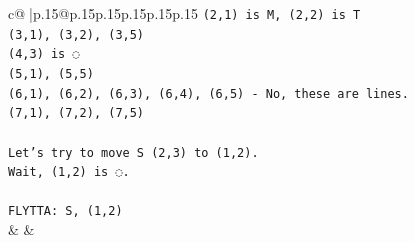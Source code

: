 \documentclass{article}
\begin{document}
{\begin{supertabular}{c@{$\;$}|p{.15\linewidth}@{}p{.15\linewidth}p{.15\linewidth}p{.15\linewidth}p{.15\linewidth}p{.15\linewidth}}
{{{\texttt{(2,1) is M, (2,2) is T} \\
\texttt{(3,1), (3,2), (3,5)} \\
\texttt{(4,3) is ◌} \\
\texttt{(5,1), (5,5)} \\
\texttt{(6,1), (6,2), (6,3), (6,4), (6,5) {-} No, these are lines.} \\
\texttt{(7,1), (7,2), (7,5)} \\
\\ 
\texttt{Let's try to move S (2,3) to (1,2).} \\
\texttt{Wait, (1,2) is ◌.} \\
\\ 
\texttt{FLYTTA: S, (1,2)} \\
            }
        }
    }
    & & \\ \\


\end{supertabular}}
\end{document}
